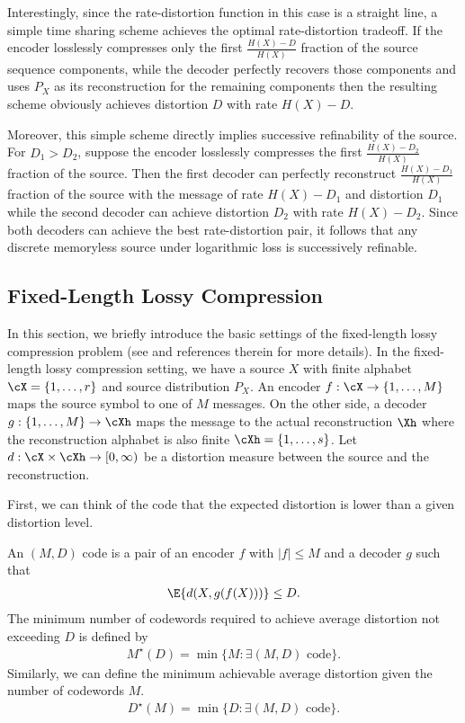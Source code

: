 \documentclass[draftclsnofoot, onecolumn, letterpaper, romanappendices]{IEEEtran}
\begin{document}
Interestingly, since the rate-distortion function in this case is a straight line,
a simple time sharing scheme achieves the optimal rate-distortion tradeoff.
If the encoder losslessly compresses only the first $\frac{H(X)-D}{H(X)}$ fraction
of the source sequence components, while the decoder perfectly recovers those components
and uses $P_X$ as its reconstruction for the remaining components then the resulting
scheme obviously achieves distortion $D$ with rate $H(X)-D$.

Moreover, this simple scheme directly implies successive refinability of the source.
For $D_1>D_2$, suppose the encoder losslessly compresses the first $\frac{H(X)-D_2}{H(X)}$
fraction of the source.
Then the first decoder can perfectly reconstruct $\frac{H(X)-D_1}{H(X)}$ fraction of the source
with the message of rate $H(X) - D_1$ and distortion $D_1$
while the second decoder can achieve distortion $D_2$ with rate $H(X)-D_2$.
Since both decoders can achieve the best rate-distortion pair,
it follows that any discrete memoryless source under logarithmic loss is successively refinable.



\subsection{Fixed-Length Lossy Compression}\label{subsec:One Shot}
In this section, we briefly introduce the basic settings of the fixed-length lossy compression problem
(see \cite{kostina2012fixed} and references therein for more details).
In the fixed-length lossy compression setting, we have a source $X$ with finite alphabet
$\cX = \{1,\ldots,r\}$ and source distribution $P_X$.
An encoder $f:\cX\rightarrow \{1,\ldots,M\}$ maps the source symbol to one of $M$ messages.
On the other side, a decoder $g:\{1,\ldots,M\}\rightarrow \cXh$ maps the message to the actual
reconstruction $\Xh$ where the reconstruction alphabet is also finite $\cXh = \{1,\ldots,s\}$.
Let $d:\cX\times \cXh\rightarrow[0,\infty)$ be a distortion measure between
the source and the reconstruction.

First, we can think of the code that the expected distortion is lower than a given distortion level.
\begin{definition}
    An $(M,D)$ code is a pair of an encoder $f$ with $|f|\leq M$ and a decoder $g$ such that
    \begin{align*}
        \E{d(X,g(f(X)))}\leq D.
    \end{align*}
    The minimum number of codewords required to achieve average distortion not exceeding $D$ is defined by
    \begin{align*}
        M^\star(D) = \min\{M: \exists (M,D)\mbox{ code}\}.
    \end{align*}
    Similarly, we can define the minimum achievable average distortion
    given the number of codewords $M$.
    \begin{align*}
        D^\star(M) = \min\{D: \exists (M,D)\mbox{ code}\}.
    \end{align*}
\end{definition}
\end{document}
